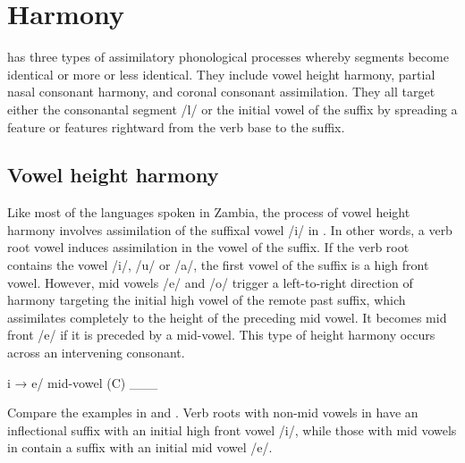 \documentclass[output=paper]{langsci/langscibook}
\begin{document}
\section{Harmony} \label{§2:harmony.kawasha}

 has three types of assimilatory phonological processes whereby segments become identical or more or less identical. They include vowel height harmony, partial nasal consonant harmony, and coronal consonant assimilation. They all target either the consonantal segment /l/ or the initial vowel of the suffix by spreading a feature or features rightward from the verb base to the suffix.

\subsection{Vowel height harmony}

Like most of the languages spoken in Zambia, the process of vowel height harmony involves assimilation of the suffixal vowel /i/ in . In other words, a verb root vowel induces assimilation in the vowel of the suffix. If the verb root contains the vowel /i/, /u/ or /a/, the first vowel of the suffix is a high front vowel. However, mid vowels /e/ and /o/ trigger a left-to-right direction of harmony targeting the initial high vowel of the remote past suffix, which assimilates completely to the height of the preceding mid vowel. It becomes mid front /e/ if it is preceded by a mid-vowel. This type of height harmony occurs across an intervening consonant.

\ea
\label{ex:2.kawasha}
i → e/ mid-vowel (C) \_\_\_

\z

Compare the examples in  and . Verb roots with non-mid vowels in  have an inflectional suffix with an initial high front vowel /i/, while those with mid vowels in  contain a suffix with an initial mid vowel /e/. 
\end{document}
